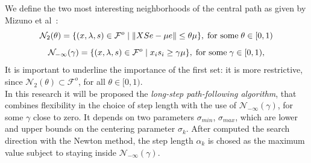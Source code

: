 \documentclass[a4paper,10 pt,titlepage,twoside]{book}
\theoremstyle{plain}
\theoremstyle{definition}
\theoremstyle{remark}
\begin{document}
 We define the two most interesting neighborhoods of the central path as given
by Mizuno et al~\cite{5}:\\
\begin{equation*}
\mathcal{N}_{2}(\theta) =\{(x, \lambda,s)\in\mathcal{F}^{o} \;|\;\lVert XSe - \mu e \rVert \leq \theta \mu \}, \text{\;for some\;} \theta \in [0,1)
\end{equation*} 
\begin{equation*}
\mathcal{N}_{-\infty}(\gamma) =\{ (x, \lambda,s)\in\mathcal{F}^{o} \;|\; x_{i}s_{i} \geq \gamma \mu \}, \text{\;for some\;} \gamma \in [0,1),
\end{equation*} 
It is important to underline the importance of the first set: it is more restrictive, since $\mathcal{N}_{2}(\theta) \subset\mathcal{F}^{o}$, for all $\theta\in[0,1)$.\\
In this research it will be proposed the \textit{long-step path-following algorithm}, that combines flexibility in the choice of step length with the use of $\mathcal{N}_{-\infty}(\gamma)$, for some $\gamma$ close to zero. It depends on two parameters $\sigma_{min}$, $\sigma_{max}$, which are lower and upper bounds on the centering parameter $\sigma_{k}$. After computed the search direction with the Newton method, the step length $\alpha_{k}$ is chosed as the maximum value subject to staying inside $\mathcal{N}_{-\infty}(\gamma)$.
\end{document}
